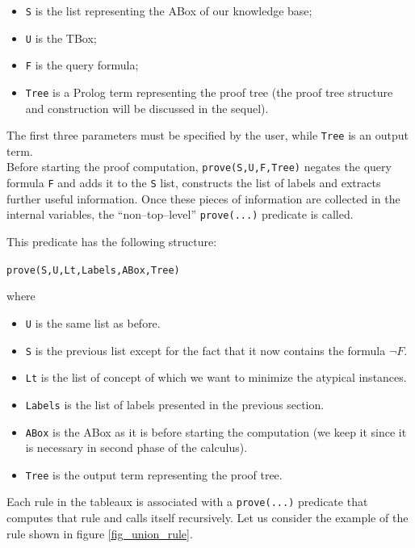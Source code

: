 \documentclass[a4paper, 11pt, oneside]{duthesis}
\begin{document}
\begin{itemize}
\item \texttt{S} is the list representing the ABox of our knowledge base;
\item \texttt{U} is the TBox;
\item \texttt{F} is the query formula;
\item \texttt{Tree} is a Prolog term representing the proof tree (the proof tree structure and construction will be discussed in the sequel).
\end{itemize}
The first three parameters must be specified by the user, while \texttt{Tree} is an output term.\\

Before starting the proof computation, \texttt{prove(S,U,F,Tree)} negates the query formula \texttt{F} and adds it to the \texttt{S} list, constructs the list of labels and extracts further useful information.
Once these pieces of information are collected in the internal variables, the ``non--top--level'' \texttt{prove(...)} predicate is called.

This predicate has the following structure:

\begin{center}\texttt{prove(S,U,Lt,Labels,ABox,Tree)}\end{center}
where

\begin{itemize}
\item \texttt{U} is the same list as before.
\item \texttt{S} is the previous list except for the fact that it now contains the formula $\neg F$.
\item \texttt{Lt} is the list of concept of which we want to minimize the atypical instances.
\item \texttt{Labels} is the list of labels presented in the previous section.
\item \texttt{ABox} is the ABox as it is before starting the computation (we keep it since it is necessary in second phase of the calculus).
\item \texttt{Tree} is the output term representing the proof tree.
\end{itemize}
Each rule in the tableaux is associated with a \texttt{prove(...)} predicate that computes that rule and calls itself recursively.
Let us consider the example of the rule shown in figure \ref{fig_union_rule}.
\end{document}
